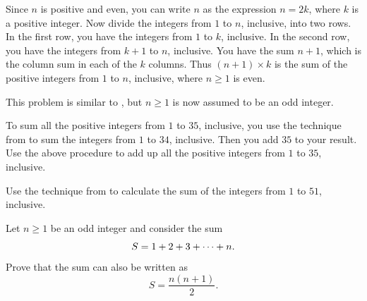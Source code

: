 \documentclass[a4paper,oneside,12pt]{article}
\begin{document}
\begin{problem}
{\begin{solution}
Since $n$ is positive and even, you can write $n$ as the expression
$n = 2k$, where $k$ is a positive integer.  Now divide the integers
from $1$ to $n$, inclusive, into two rows.  In the first row, you have
the integers from $1$ to $k$, inclusive.  In the second row, you have
the integers from $k + 1$ to $n$, inclusive.  You have the sum
$n + 1$, which is the column sum in each of the $k$ columns.  Thus
$(n + 1) \times k$ is the sum of the positive integers from $1$ to
$n$, inclusive, where $n \geq 1$ is even.
\end{solution}
}{}

\item This problem is similar to
  , but $n \geq 1$ is
  now assumed to be an odd integer.
  \begin{packedenum}
  \item\label{subprob:sum_integers_from_1_to_35}
    To sum all the positive integers from $1$ to $35$, inclusive, you
    use the technique from
     to sum the
    integers from $1$ to $34$, inclusive.  Then you add $35$ to your
    result.  Use the above procedure to add up all the positive
    integers from $1$ to $35$, inclusive.

  \item\label{subprob:sum_integers_from_1_to_51}
    Use the technique from  to
    calculate the sum of the integers from $1$ to $51$, inclusive.

  \item\label{subprob:sum_integers_n_odd}
    Let $n \geq 1$ be an odd integer and consider the sum
    \[
    S
    =
    {1 + 2} + {3} + \cdots + {n}.
    \]
    Prove that the sum can also be written as
    \[
    S
    =
    \frac{
      n(n + 1)
    }{
      2
    }.
    \]
  \end{packedenum}
\end{problem}
\end{document}
